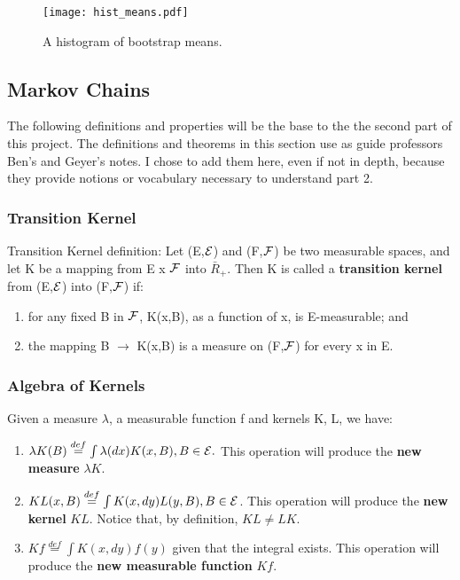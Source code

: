 \newpage

\begin{figure}
  \centering
	\texttt{[image: hist\_means.pdf]}
	  \caption{A histogram of bootstrap means.}
\end{figure}




\subsection{Markov Chains}

The following definitions and properties will be the base to the the second part of this project. The definitions and theorems in this section use as guide professors Ben's and Geyer's notes. I chose to add them here, even if not in depth, because they provide notions or vocabulary necessary to understand part 2.

\subsubsection{Transition Kernel}\label{kernel_section}

Transition Kernel definition: Let (E,$\mathcal{E}$) and (F,$\mathcal{F}$) be two measurable spaces, and let K be a mapping from E x $\mathcal{F}$ into $\bar{R}_+$. Then K is called a\textbf{ transition kernel} from (E,$\mathcal{E}$) into (F,$\mathcal{F}$) if:

\begin{enumerate}[label=\alph*)]
\item for any fixed B in $\mathcal{F}$, K(x,B), as a function of x, is E-measurable; and

\item\label{prob_meas} the mapping B $\rightarrow$ K(x,B) is a measure on (F,$\mathcal{F}$) for every x in E.
\end{enumerate}

\subsubsection{Algebra of Kernels}\label{alg_kernels}
Given a measure $\lambda$, a measurable function f and kernels K, L, we have:

\begin{enumerate}[label=\alph*)]
\item$ \lambda K (B)  \overset{def}{=} \int \lambda(dx)K(x, B), B \in \mathcal{E}.$ This operation will produce the \textbf{new measure} $\lambda K$.

\item$KL(x, B) \overset{def}{=} \int K(x, dy)L(y, B), B \in \mathcal{E}$. This operation will produce the \textbf{new kernel} $KL$. Notice that, by definition, $KL \neq LK$.
 
\item$Kf \overset{def}{=} \int K(x, dy)f(y)$ given that the integral exists. This operation will produce the \textbf{new measurable function} $Kf$. 

\end{enumerate}

